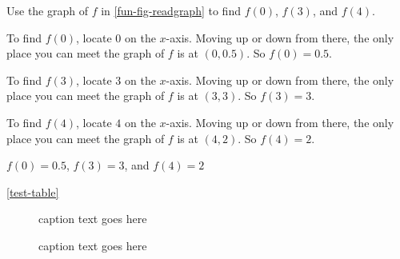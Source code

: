 \begin{checkpoint}
\begin{problem}
Use the graph of $f$ in \cref{fun-fig-readgraph} to find $f(0)$, $f(3)$, and $f(4)$.
%
\begin{longsolution}
%
 To find $f(0)$, locate $0$ on the $x$-axis. Moving up or down from there, the only place you can meet the graph
					of $f$ is at $(0,0.5)$. So $f(0)=0.5$.
%
\par  To find $f(3)$, locate $3$ on the $x$-axis. Moving up or down from there, the only place you can meet the graph
                                        of $f$ is at $(3,3)$. So $f(3)=3$.
%
\par  To find $f(4)$, locate $4$ on the $x$-axis. Moving up or down from there, the only place you can meet the graph
                                        of $f$ is at $(4,2)$. So $f(4)=2$.
%

%
\end{longsolution}
%
\begin{shortsolution}
%
$f(0)=0.5$, $f(3)=3$, and $f(4)=2$
					
%
\end{shortsolution}
%
\end{problem}
%
\end{checkpoint}
%
\cref{test-table}
\begin{figure}[h]
				\begin{minipage}{.50\textwidth}
\centering
                  \caption{caption text goes here}
\end{minipage}%
				\begin{minipage}{.50\textwidth}
\centering
                  \caption{caption text goes here}
\end{minipage}%
         \end{figure}

